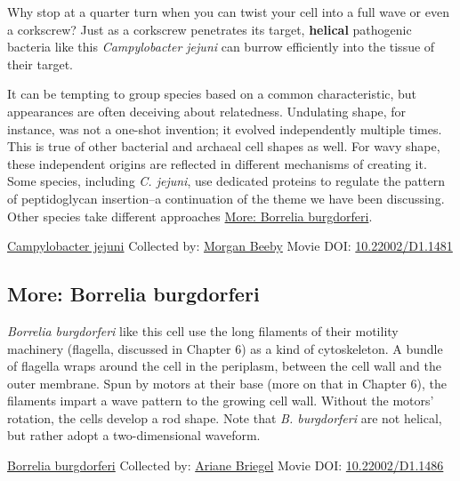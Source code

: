 \documentclass[]{tufte-book}
\begin{document}
Why stop at a quarter turn when you can twist your cell into a full wave or even a corkscrew? Just as a corkscrew penetrates its target, \textbf{helical} pathogenic bacteria like this \emph{Campylobacter jejuni} can burrow efficiently into the tissue of their target.

It can be tempting to group species based on a common characteristic, but appearances are often deceiving about relatedness. Undulating shape, for instance, was not a one-shot invention; it evolved independently multiple times. This is true of other bacterial and archaeal cell shapes as well. For wavy shape, these independent origins are reflected in different mechanisms of creating it. Some species, including \emph{C. jejuni}, use dedicated proteins to regulate the pattern of peptidoglycan insertion--a continuation of the theme we have been discussing. Other species take different approaches \protect\hyperlink{Borrelia_burgdorferi}{More: Borrelia burgdorferi}.



\hypertarget{htmlwidget-db9f41626839f6f32996}{}

\label{fig:3-5}\protect\hyperlink{tree}{Campylobacter jejuni} Collected by: \protect\hyperlink{morgan_beeby}{Morgan Beeby} Movie DOI: \href{https://doi.org/10.22002/D1.1481}{10.22002/D1.1481}

\hypertarget{Borrelia_burgdorferi}{%
\subsection*{More: Borrelia burgdorferi}\label{Borrelia_burgdorferi}}

\emph{Borrelia burgdorferi} like this cell use the long filaments of their motility machinery (flagella, discussed in Chapter 6) as a kind of cytoskeleton. A bundle of flagella wraps around the cell in the periplasm, between the cell wall and the outer membrane. Spun by motors at their base (more on that in Chapter 6), the filaments impart a wave pattern to the growing cell wall. Without the motors' rotation, the cells develop a rod shape. Note that \emph{B. burgdorferi} are not helical, but rather adopt a two-dimensional waveform.



\hypertarget{htmlwidget-b597cec7ce74e9c775f2}{}

\label{fig:3-5a}\protect\hyperlink{tree}{Borrelia burgdorferi} Collected by: \protect\hyperlink{ariane_briegel}{Ariane Briegel} Movie DOI: \href{https://doi.org/10.22002/D1.1486}{10.22002/D1.1486}
\end{document}

